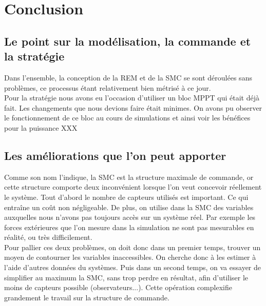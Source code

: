 \section{Conclusion}

\subsection{Le point sur la modélisation, la commande et la stratégie}

Dans l'ensemble, la conception de la REM et de la SMC se sont déroulées sans problèmes, ce processus étant relativement bien métrisé à ce jour. \\
Pour la stratégie nous avons eu l'occasion d'utiliser un bloc MPPT qui était déjà fait. Les changements que nous devions faire était minimes. On avons pu observer le fonctionnement de ce bloc au cours de simulations et ainsi voir les bénéfices pour la  puissance XXX
 

\subsection{Les améliorations que l'on peut apporter}

Comme son nom l'indique, la SMC est la structure maximale de commande, or cette structure comporte deux inconvénient lorsque l'on veut concevoir réellement le système. Tout d'abord le nombre de capteurs utilisés est important. Ce qui entraîne un coût non négligeable. De plus, on utilise dans la SMC des variables auxquelles nous n'avons pas toujours accès sur un système réel. Par exemple les forces extérieures que l'on mesure dans la simulation ne sont pas mesurables en réalité, ou très difficilement. \\

Pour pallier ces deux problèmes, on doit donc dans un premier temps, trouver un moyen de contourner les variables inaccessibles. On cherche donc à les estimer à l'aide d'autres données du systèmes. Puis dans un second temps, on va essayer de simplifier au maximum la SMC, sans trop perdre en résultat, afin d'utiliser le moins de capteurs possible (observateurs...). Cette opération complexifie grandement le travail sur la structure de commande. 